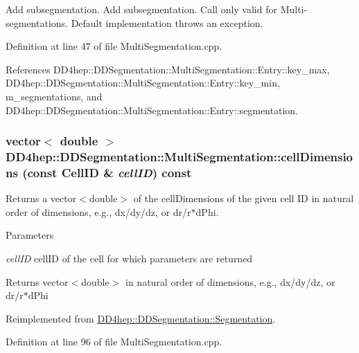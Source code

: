 Add subsegmentation. Add subsegmentation. Call only valid for Multi-\/segmentations. Default implementation throws an exception. 

Definition at line 47 of file MultiSegmentation.cpp.

References DD4hep::DDSegmentation::MultiSegmentation::Entry::key\_\-max, DD4hep::DDSegmentation::MultiSegmentation::Entry::key\_\-min, m\_\-segmentations, and DD4hep::DDSegmentation::MultiSegmentation::Entry::segmentation.\hypertarget{class_d_d4hep_1_1_d_d_segmentation_1_1_multi_segmentation_a2762cc8dd45fdfcab8aa8dfaea47e7fd}{
\subsubsection[{cellDimensions}]{\setlength{\rightskip}{0pt plus 5cm}vector$<$ double $>$ DD4hep::DDSegmentation::MultiSegmentation::cellDimensions (const {\bf CellID} \& {\em cellID}) const}}
\label{class_d_d4hep_1_1_d_d_segmentation_1_1_multi_segmentation_a2762cc8dd45fdfcab8aa8dfaea47e7fd}


Returns a vector$<$double$>$ of the cellDimensions of the given cell ID in natural order of dimensions, e.g., dx/dy/dz, or dr/r$\ast$dPhi. 
\begin{DoxyParams}{Parameters}
\item[{\em cellID}]cellID of the cell for which parameters are returned \end{DoxyParams}
\begin{DoxyReturn}{Returns}
vector$<$double$>$ in natural order of dimensions, e.g., dx/dy/dz, or dr/r$\ast$dPhi 
\end{DoxyReturn}


Reimplemented from \hyperlink{class_d_d4hep_1_1_d_d_segmentation_1_1_segmentation_a9710f4942d7f6b52ae5342652e17c88d}{DD4hep::DDSegmentation::Segmentation}.

Definition at line 96 of file MultiSegmentation.cpp.

